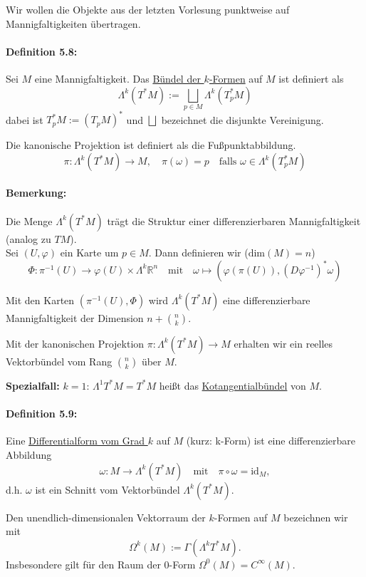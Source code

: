 \documentclass[fleqn, 12pt, letterpaper]{article}
\newcommand{\txt}[1]{\text{#1}}
\begin{document}
Wir wollen die Objekte aus der letzten Vorlesung punktweise auf Mannigfaltigkeiten übertragen.

\paragraph{Definition 5.8:} Sei \( M \) eine Mannigfaltigkeit. Das \underline{Bündel der \( k \)-Formen} auf \( M \) ist definiert als
\[
\Lambda^k (T^*M) := \bigsqcup_{p \in M} \Lambda^k (T^*_p M)
\]
dabei ist \( T^*_p M := (T_p M)^* \) und \( \bigsqcup \) bezeichnet die disjunkte Vereinigung.

Die kanonische Projektion ist definiert als die Fußpunktabbildung. 
\[
\pi : \Lambda^k (T^*M) \to M, \quad \pi(\omega) = p \quad \text{falls } \omega \in \Lambda^k (T^*_p M)
\]
\paragraph{Bemerkung:} Die Menge \( \Lambda^k(T^*M) \) trägt die Struktur einer differenzierbaren Mannigfaltigkeit (analog zu \( TM \)).\\

Sei \( (U, \varphi) \) ein Karte um \( p \in M \). Dann definieren wir ($\txt{dim}(M)=n$)
\[
\Phi : \pi^{-1}(U) \longrightarrow \varphi(U)\times \Lambda^k\mathbb{R}^n \quad \text{mit} \quad \omega \mapsto \left(\varphi(\pi(U)), (D\varphi^{-1})^*\omega \right)
\]

Mit den Karten \( (\pi^{-1}(U), \Phi) \) wird \( \Lambda^k(T^*M) \) eine differenzierbare Mannigfaltigkeit der Dimension $n+\binom{n}{k}$.

Mit der kanonischen Projektion \( \pi : \Lambda^k(T^*M) \to M \) erhalten wir ein reelles Vektorbündel vom Rang \( \binom{n}{k} \) über \( M \).

\textbf{Spezialfall:} \( k = 1 \): \quad \( \Lambda^1 T^*M = T^*M \) heißt das \underline{Kotangentialbündel} von \( M \).

\paragraph{Definition 5.9:} 
Eine \underline{Differentialform vom Grad \( k \)} auf \( M \) (kurz: k-Form) ist eine differenzierbare Abbildung
\[
\omega : M \longrightarrow \Lambda^k(T^*M) \quad \text{mit} \quad \pi \circ \omega = \mathrm{id}_M,
\]
d.h. \( \omega \) ist ein Schnitt vom Vektorbündel $\Lambda^k(T^*M)$.

Den unendlich-dimensionalen Vektorraum der \( k \)-Formen auf \( M \) bezeichnen wir mit
\[
\Omega^k(M) := \Gamma(\Lambda^k T^*M).
\]
Insbesondere gilt für den Raum der 0-Form $\Omega^0(M)=C^\infty(M)$.\\
\end{document}
